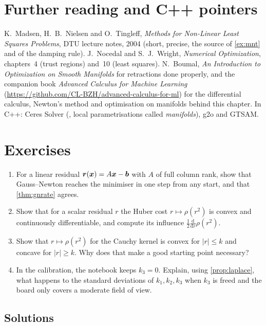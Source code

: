 \section*{Further reading and C++ pointers}

K.~Madsen, H.~B.~Nielsen and O.~Tingleff, \emph{Methods for Non-Linear
Least Squares Problems}, DTU lecture notes, 2004 (short, precise, the
source of \cref{ex:mnt} and of the damping rule). J.~Nocedal and
S.~J.~Wright, \emph{Numerical Optimization}, chapters~4 (trust regions)
and~10 (least squares). N.~Boumal, \emph{An Introduction to Optimization
on Smooth Manifolds} for retractions done properly, and the companion
book \emph{Advanced Calculus for Machine Learning}
(\url{https://github.com/CL-BZH/advanced-calculus-for-ml}) for the
differential calculus, Newton's method and optimisation on manifolds
behind this chapter. In C++: Ceres Solver
(, local parametrisations called \emph{manifolds}),
g2o and GTSAM.

\FloatBarrier
\section*{Exercises}

\begin{enumerate}[label=\textbf{4.\arabic*},ref=4.\arabic*]
\item\label{ex:4linear} For a linear residual $\bm{r}(\bm{x})=A\bm{x}-\bm{b}$
  with $A$ of full column rank, show that Gauss--Newton reaches the
  minimiser in one step from any start, and that \cref{thm:gnrate} agrees.
\item\label{ex:4huber} Show that for a scalar residual $r$ the Huber
  cost $r\mapsto\rho(r^2)$ is convex and continuously differentiable,
  and compute its influence $\frac12\frac{\mathrm d}{\mathrm dr}\rho(r^2)$.
\item\label{ex:4cauchy} Show that $r\mapsto\rho(r^2)$ for the Cauchy
  kernel is convex for $|r|\le k$ and concave for $|r|\ge k$. Why does
  that make a good starting point necessary?
\item\label{ex:4k3} In the calibration, the notebook keeps $k_3=0$.
  Explain, using \cref{prop:laplace}, what happens to the standard
  deviations of $k_1,k_2,k_3$ when $k_3$ is freed and the board only
  covers a moderate field of view.
\end{enumerate}

\subsection*{Solutions}

